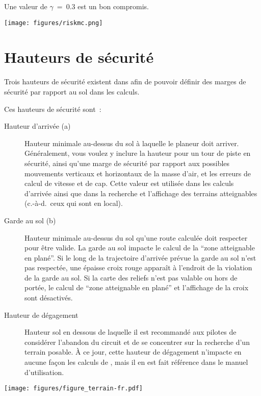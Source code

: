 Une valeur de $\gamma$~=~0.3 est un bon compromis.

\begin{center}
\texttt{[image: figures/riskmc.png]}
\end{center}


\section{Hauteurs de sécurité}\label{sec:safety-heights}

Trois hauteurs de sécurité existent dans \xc{} afin de pouvoir définir des marges de sécurité par rapport au sol dans les calculs.

Ces hauteurs de sécurité sont~:
\begin{description}
\item[Hauteur d'arrivée (a)] Hauteur minimale au-dessus du sol à laquelle le planeur doit arriver.
Généralement, vous voulez y inclure la hauteur pour un tour de piste en sécurité, ainsi qu'une marge de sécurité par rapport aux possibles mouvements verticaux et horizontaux de la masse d'air, et les erreurs de calcul de vitesse et de cap.
Cette valeur est utilisée dans les calculs d'arrivée ainsi que dans la recherche et l'affichage des terrains atteignables (c.-à-d.\ ceux qui sont en local).
\item[Garde au sol (b)] Hauteur minimale au-dessus du sol qu'une route calculée doit respecter pour être valide.
La garde au sol impacte le calcul de la ``zone atteignable en plané''.
Si le long de la trajectoire d'arrivée prévue la garde au sol n'est pas respectée, une épaisse croix rouge apparaît à l'endroit de la violation de la garde au sol.
Si la carte des reliefs n'est pas valable ou hors de portée, le calcul de ``zone atteignable en plané'' et l'affichage de la croix sont désactivés.
\item[Hauteur de dégagement] Hauteur sol en dessous de laquelle il est recommandé aux pilotes de considérer l'abandon du circuit et de se concentrer sur la recherche d'un terrain posable.
À ce jour, cette hauteur de dégagement n'impacte en aucune façon les calculs de \xc, mais il en est fait référence dans le manuel d'utilisation.
\end{description}

\begin{center}
\texttt{[image: figures/figure\_terrain-fr.pdf]}
\end{center}

